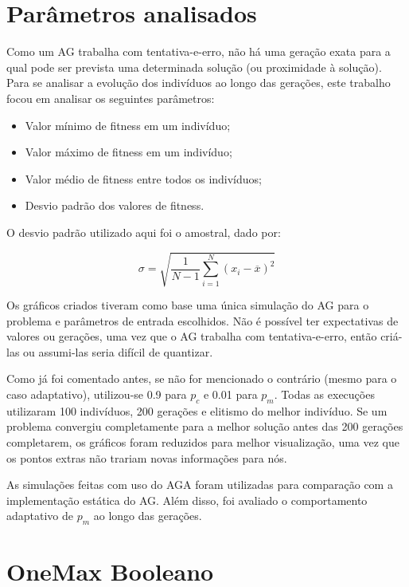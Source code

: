 \label{5_resultados}

\section{Parâmetros analisados}

Como um AG trabalha com tentativa-e-erro, não há uma geração exata para a qual pode ser prevista uma determinada solução (ou proximidade à solução). Para se analisar a evolução dos indivíduos ao longo das gerações, este trabalho focou em analisar os seguintes parâmetros:

\begin{itemize}
	\item Valor mínimo de fitness em um indivíduo;
	\item Valor máximo de fitness em um indivíduo;
	\item Valor médio de fitness entre todos os indivíduos;
	\item Desvio padrão dos valores de fitness.
\end{itemize}

O desvio padrão utilizado aqui foi o amostral, dado por:

\begin{equation}
	\sigma = \sqrt{\frac{1}{N-1} \sum_{i=1}^N (x_i - \overline{x})^2}
\end{equation}

Os gráficos criados tiveram como base uma única simulação do AG para o problema e parâmetros de entrada escolhidos. Não é possível ter expectativas de valores ou gerações, uma vez que o AG trabalha com tentativa-e-erro, então criá-las ou assumi-las seria difícil de quantizar.

Como já foi comentado antes, se não for mencionado o contrário (mesmo para o caso adaptativo), utilizou-se 0.9 para $p_c$ e 0.01 para $p_m$. Todas as execuções utilizaram 100 indivíduos, 200 gerações e elitismo do melhor indivíduo. Se um problema convergiu completamente para a melhor solução antes das 200 gerações completarem, os gráficos foram reduzidos para melhor visualização, uma vez que os pontos extras não trariam novas informações para nós.

As simulações feitas com uso do AGA foram utilizadas para comparação com a implementação estática do AG. Além disso, foi avaliado o comportamento adaptativo de $p_m$ ao longo das gerações.

\section{OneMax Booleano}

